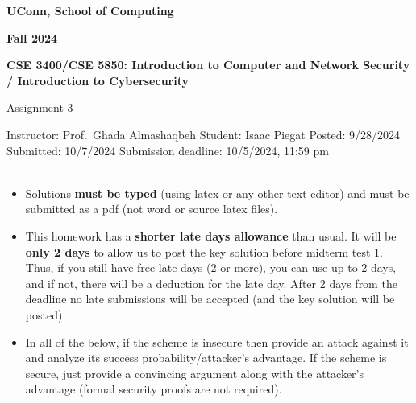 \documentclass[12pt]{article}
\newcommand{\handout}[2]{
\renewcommand{\thepage}{\footnotesize CSE 3400/CSE 5850, #1, p. \arabic{page}}
\begin{center}

\noindent
{\bf UConn, School of Computing}

\noindent
{\bf Fall 2024}

\noindent
{\bf CSE 3400/CSE 5850: Introduction to Computer and Network Security \\ / Introduction to Cybersecurity}
\end{center}

\begin{center}
{\Large #1}
\end{center}
}
\begin{document}
\handout{Assignment 3}{}

\noindent
{Instructor: Prof.~Ghada Almashaqbeh}
\newline
{Student: Isaac Piegat}
\newline
\noindent
{Posted: 9/28/2024}
\newline
{Submitted: 10/7/2024}
\noindent
\newline
{Submission deadline: 10/5/2024, 11:59 pm} \\\\

\begin{itemize}
\item Solutions {\bf must be typed} (using latex or any other text editor) and must be submitted as a pdf (not word or source latex files).

\item This homework has a \textbf{shorter late days allowance} than usual. It will be \textbf{only 2 days} to allow us to post the key solution before midterm test 1. Thus, if you still have free late days (2 or more), you can use up to 2 days, and if not, there will be a deduction for the late day. After 2 days from the deadline no late submissions will be accepted (and the key solution will be posted).

\item In all of the below, if the scheme is insecure then provide an attack against it and analyze its success probability/attacker's advantage. If the scheme is secure, just provide a convincing argument along with the attacker's advantage (formal security proofs are not required).
\\
\end{itemize}
\end{document}

